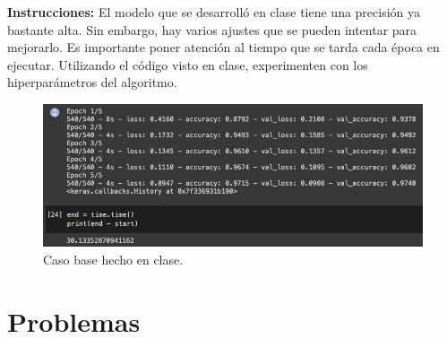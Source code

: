 





\textbf{Instrucciones:} El modelo que se desarrolló en clase tiene una precisión ya bastante alta.  Sin embargo, hay varios ajustes que se pueden intentar para mejorarlo. Es importante poner atención al tiempo que se tarda cada época en ejecutar. Utilizando el código visto en clase, experimenten con  los hiperparámetros del algoritmo.

\begin{figure}[H]
	\centering
	\includegraphics[scale=0.5]{Images/1.png}
	\caption{Caso base hecho en clase.}
\end{figure}
\section{Problemas}

